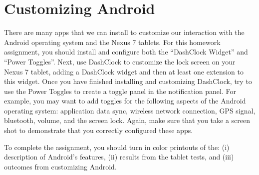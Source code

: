 \section*{Customizing Android}

There are many apps that we can install to customize our interaction with the Android operating system and the Nexus 7
tablets.  For this homework assignment, you should install and configure both the ``DashClock Widget'' and ``Power Toggles''.
Next, use DashClock to customize the lock screen on your Nexus 7 tablet, adding a DashClock widget and then at least one extension
to this widget.  Once you have finished installing and customizing DashClock, try to use the Power Toggles to create a
toggle panel in the notification panel.  For example, you may want to add toggles for the following aspects of the
Android operating system: application data sync, wireless network connection, GPS signal, bluetooth, volume, and the
screen lock.  Again, make sure that you take a screen shot to demonstrate that you correctly configured these apps.

To complete the assignment, you should turn in color printouts of the: (i) description of Android's features, (ii)
results from the tablet tests, and (iii) outcomes from customizing Android.

% 
% 
% 	
% 
% 
% 


